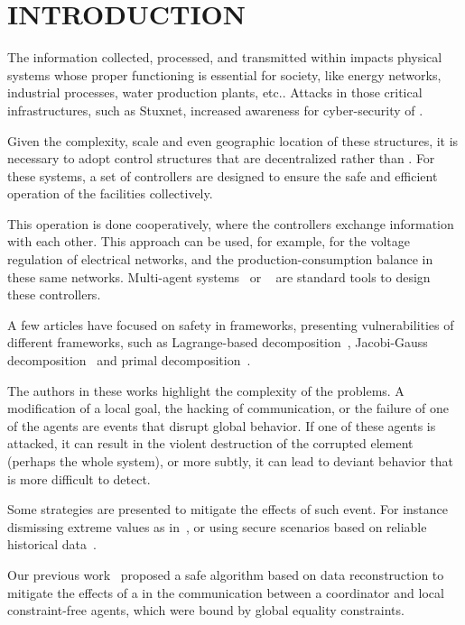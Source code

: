 \documentclass{ifacconf}  %
\begin{document}
\section{INTRODUCTION}
The information collected, processed, and transmitted within \cps{} impacts physical systems whose proper functioning is essential for society, like energy networks, industrial processes, water production plants, etc..
Attacks in those critical infrastructures, such as Stuxnet, increased awareness for cyber-security of \cps{}.

Given the complexity, scale and even geographic location of these structures, it is necessary to adopt control structures that are decentralized rather than .
For these systems, a set of controllers are designed to ensure the safe and efficient operation of the facilities collectively.

This operation is done cooperatively, where the controllers exchange information with each other.
This approach can be used, for example, for the voltage regulation of electrical networks, and the production-consumption balance in these same networks.
Multi-agent systems~\citep{KantamneniEtAl2015} or \dmpc{}~\citep{MaestreEtAl2014} are standard tools to design these controllers.

A few articles have focused on safety in \dmpc{} frameworks, presenting vulnerabilities of different frameworks, such as Lagrange-based decomposition~\citep{VelardeEtAl2017}, Jacobi-Gauss decomposition~\citep{ChanfreutEtAl2018} and primal decomposition~\citep{NogueiraEtAl2021}.

The authors in these works highlight the complexity of the problems. A modification of a local goal, the hacking of communication, or the failure of one of the agents are events that disrupt global behavior.
If one of these agents is attacked, it can result in the violent destruction of the corrupted element (perhaps the whole system), or more subtly, it can lead to deviant behavior that is more difficult to detect.

Some strategies are presented to mitigate the effects of such event.
For instance dismissing extreme values as in~\cite{VelardeEtAl2017}, or
using secure scenarios based on reliable historical data~\cite{MaestreEtAl2021}.

Our previous work~\citep{NogueiraEtAl2021} proposed a safe algorithm based on data reconstruction to mitigate the effects of a \fdi{} in the communication between a coordinator and local constraint-free agents, which were bound by global equality constraints.
\end{document}
